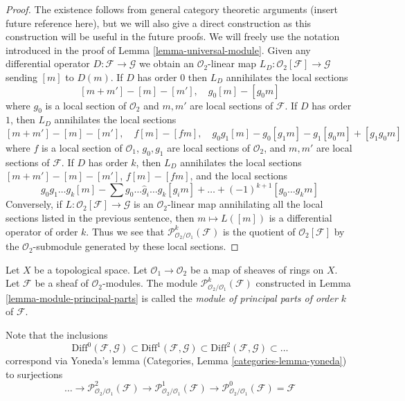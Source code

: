 \begin{proof}
The existence follows from general category theoretic arguments
(insert future reference here), but we will also give a direct
construction as this construction will be useful in the future proofs.
We will freely use the notation introduced in the proof of
Lemma \ref{lemma-universal-module}.
Given any differential operator $D : \mathcal{F} \to \mathcal{G}$
we obtain an $\mathcal{O}_2$-linear map
$L_D : \mathcal{O}_2[\mathcal{F}] \to \mathcal{G}$
sending $[m]$ to $D(m)$. If $D$ has order $0$
then $L_D$ annihilates the local sections
$$
[m + m'] - [m] - [m'],\quad
g_0[m] - [g_0m]
$$
where $g_0$ is a local section of $\mathcal{O}_2$ and $m, m'$
are local sections of $\mathcal{F}$. If $D$ has order $1$, then $L_D$
annihilates the local sections
$$
[m + m'] - [m] - [m'],\quad
f[m] - [fm], \quad
g_0g_1[m] - g_0[g_1m] - g_1[g_0m] + [g_1g_0m]
$$
where $f$ is a local section of $\mathcal{O}_1$,
$g_0, g_1$ are local sections of $\mathcal{O}_2$, and
$m, m'$ are local sections of $\mathcal{F}$.
If $D$ has order $k$, then $L_D$ annihilates the local sections
$[m + m'] - [m] - [m']$, $f[m] - [fm]$, and the local sections
$$
g_0g_1\ldots g_k[m] - \sum g_0 \ldots \hat g_i \ldots g_k[g_im] + \ldots
+(-1)^{k + 1}[g_0\ldots g_km]
$$
Conversely, if $L : \mathcal{O}_2[\mathcal{F}] \to \mathcal{G}$ is an
$\mathcal{O}_2$-linear map annihilating all the local sections
listed in the previous sentence, then $m \mapsto L([m])$ is a
differential operator of order $k$. Thus we see that
$\mathcal{P}^k_{\mathcal{O}_2/\mathcal{O}_1}(\mathcal{F})$
is the quotient of $\mathcal{O}_2[\mathcal{F}]$
by the $\mathcal{O}_2$-submodule generated by these local sections.
\end{proof}

\begin{definition}
\label{definition-module-principal-parts}
Let $X$ be a topological space.
Let $\mathcal{O}_1 \to \mathcal{O}_2$ be a map of sheaves of rings on $X$.
Let $\mathcal{F}$ be a sheaf of $\mathcal{O}_2$-modules.
The module $\mathcal{P}^k_{\mathcal{O}_2/\mathcal{O}_1}(\mathcal{F})$
constructed in Lemma \ref{lemma-module-principal-parts}
is called the {\it module of principal parts of order $k$} of $\mathcal{F}$.
\end{definition}

\noindent
Note that the inclusions
$$
\text{Diff}^0(\mathcal{F}, \mathcal{G}) \subset
\text{Diff}^1(\mathcal{F}, \mathcal{G}) \subset
\text{Diff}^2(\mathcal{F}, \mathcal{G}) \subset \ldots
$$
correspond via Yoneda's lemma (Categories, Lemma \ref{categories-lemma-yoneda})
to surjections
$$
\ldots \to \mathcal{P}^2_{\mathcal{O}_2/\mathcal{O}_1}(\mathcal{F})
\to \mathcal{P}^1_{\mathcal{O}_2/\mathcal{O}_1}(\mathcal{F})
\to \mathcal{P}^0_{\mathcal{O}_2/\mathcal{O}_1}(\mathcal{F}) = \mathcal{F}
$$

